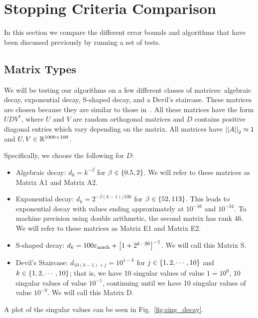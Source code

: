 \section{Stopping Criteria Comparison}
\label{sec:rand_exp}

In this section we compare the different error bounds and algorithms
that have been discussed previously by running a set of tests.

\subsection{Matrix Types}

%
%
%
%

We will be testing our algorithms on a few different classes of matrices:
algebraic decay, exponential decay, S-shaped decay, and a Devil's staircase.
These matrices are chosen because they are similar to those
in~\cite{yu2018efficient}.
All these matrices have the form $UDV^{*}$, where $U$ and $V$
are random orthogonal matrices and $D$ contains positive
diagonal entries which vary depending on the matrix.
All matrices have $\left| \left| A \right| \right|_{2}\approx1$ and
$U,V\in\mathbb{R}^{1000\times100}$.

Specifically, we choose the following for $D$:
\begin{itemize}
\item Algebraic decay: $d_{k} = k^{-\beta}$
    for $\beta\in\left\{ 0.5,2 \right\}$. We will refer to these matrices
    as Matrix A1 and Matrix A2.
\item Exponential decay: $d_{k} = 2^{-\beta(k-1)/100}$ for
    $\beta\in\left\{ 52,113 \right\}$. This leads to exponential decay with
    values ending approximately at $10^{-16}$ and $10^{-34}$.
    To machine precision using double arithmetic,
    the second matrix has rank 46.
    We will refer to these matrices as Matrix E1 and Matrix E2.
\item S-shaped decay: $d_{k} = 100\varepsilon_{\text{mach}} + \left[ 1+2^{k-26} \right]^{-1}$.
    We will call this Matrix S.
\item Devil's Staircase: $d_{10(k-1)+j} = 10^{1-k}$
    for $j\in\left\{ 1,2,\cdots,10 \right\}$ and $k\in\left\{ 1,2,\cdots,10 \right\}$;
    that is, we have 10 singular values of value $1=10^{0}$, 10 singular values
    of value $10^{-1}$, continuing until we have 10 singular values of
    value $10^{-9}$.
    We will call this Matrix D.
\end{itemize}
%
A plot of the singular values can be seen in Fig.~\ref{fig:sing_decay}.

